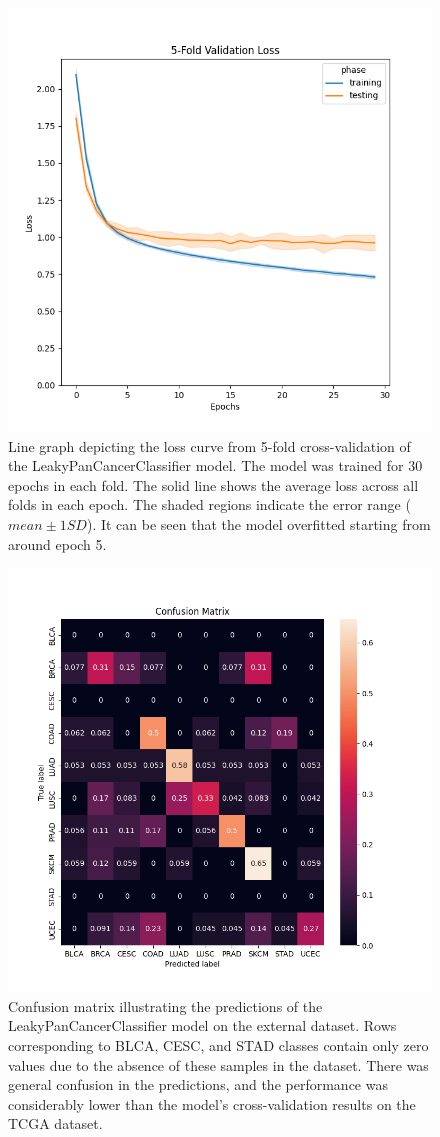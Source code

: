 \documentclass{l4proj}
\begin{document}
\begin{appendices}
\begin{figure}
    \centering
    \includegraphics[width=0.75\linewidth]{images/fold_loss_curve.png}
    \caption{Line graph depicting the loss curve from 5-fold cross-validation of the LeakyPanCancerClassifier model. The model was trained for 30 epochs in each fold. The solid line shows the average loss across all folds in each epoch. The shaded regions indicate the error range ($mean\pm 1SD$). It can be seen that the model overfitted starting from around epoch 5.}
    \label{fig:fold_losses}
\end{figure}

\begin{figure}
    \centering
    \includegraphics[width=.75\linewidth]{images/ext_conf.png}
    \caption{Confusion matrix illustrating the predictions of the LeakyPanCancerClassifier model on the external dataset. Rows corresponding to BLCA, CESC, and STAD classes contain only zero values due to the absence of these samples in the dataset. There was general confusion in the predictions, and the performance was considerably lower than the model's cross-validation results on the TCGA dataset.}
    \label{fig:ext_conf}
\end{figure}


\end{appendices}
\end{document}
